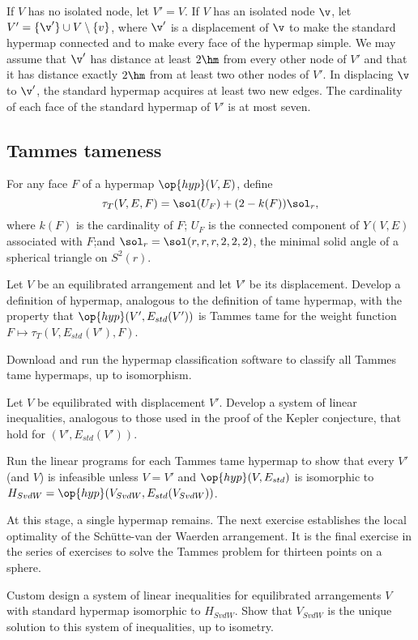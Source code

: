 If $V$ has no isolated node, let $V'=V$.  If $V$ has an isolated node
$\v$, let $V' = \{\v'\}\cup V\setminus\{v\}$, where $\v'$ is a
displacement of $\v$ to make the standard hypermap connected and to
make every face of the hypermap simple.  We may assume that $\v'$ has
distance  at least $2\hm$ from every other node of $V'$ and that it
has distance  exactly $2\hm$ from at least two other nodes of $V'$.  In
displacing $\v$ to $\v'$, the standard hypermap acquires at least two
new edges.  The cardinality of each face of the standard hypermap of
$V'$ is at most seven.


\subsection{Tammes tameness}

For any face $F$ of a hypermap $\op{hyp}(V,E)$, define
\[
\tau_T(V,E,F) = \sol(U_F) + (2- k(F)) \sol_r,
\]
where $k(F)$ is the cardinality of $F$; $U_F$ is the connected
component of $Y(V,E)$ associated with $F$;and $\sol_r =
\sol(r,r,r,2,2,2)$, the minimal solid angle of a spherical triangle on
$S^2(r)$.

\begin{exer}  
  Let $V$ be an equilibrated arrangement and let $V'$ be its
  displacement.  Develop a definition of 
  hypermap, analogous to the definition of tame hypermap, with the
  property that $\op{hyp}(V',E_{std}(V'))$ is Tammes tame for the
  weight function $F\mapsto \tau_T(V,E_{std}(V'),F)$.
\end{exer}

\begin{exer}  
  Download and run the hypermap classification software to classify all Tammes tame
  hypermaps, up to isomorphism.
\end{exer}

\begin{exer} Let $V$ be equilibrated with displacement $V'$.  Develop
  a system of linear inequalities, analogous to those used in the
  proof of the Kepler conjecture, that hold for $(V',E_{std}(V'))$.  
\end{exer}

\begin{exer}
  Run the linear programs for each Tammes tame hypermap to show that
  every $V'$ (and $V$) is infeasible unless $V=V'$ and
  $\op{hyp}(V,E_{std})$ is isomorphic to
  $H_{SvdW}=\op{hyp}(V_{SvdW},E_{std}(V_{SvdW}))$.
\end{exer}

At this stage, a single hypermap remains.  The next exercise
establishes the local optimality of the Sch\"utte-van der Waerden
arrangement.  It is the final exercise in the series of exercises to
solve the Tammes problem for thirteen points on a sphere.

\begin{exer} 
  Custom design a system of linear inequalities for equilibrated
  arrangements $V$ with standard hypermap  isomorphic to
  $H_{SvdW}$.  Show that $V_{SvdW}$ is the unique solution to this
  system of inequalities, up to isometry.
\end{exer}





